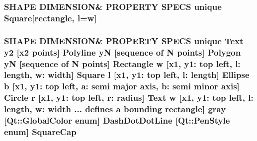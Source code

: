 \subsubsection[{\texorpdfstring{Square}{Square}}]{\setlength{\rightskip}{0pt plus 5cm}S\+H\+A\+PE D\+I\+M\+E\+N\+S\+I\+ON\& P\+R\+O\+P\+E\+R\+TY S\+P\+E\+CS unique {\bf Square}\mbox{[}rectangle, {\bf l}=w\mbox{]}}\hypertarget{shape__input__file__specs_8txt_ad077d50a4f33b6bb8f3d3b5f14c196fd}{}\label{shape__input__file__specs_8txt_ad077d50a4f33b6bb8f3d3b5f14c196fd}
\subsubsection[{\texorpdfstring{Square\+Cap}{SquareCap}}]{\setlength{\rightskip}{0pt plus 5cm}S\+H\+A\+PE D\+I\+M\+E\+N\+S\+I\+ON\& P\+R\+O\+P\+E\+R\+TY S\+P\+E\+CS unique {\bf Text} {\bf y2} \mbox{[}{\bf x2} points\mbox{]} {\bf Polyline} yN \mbox{[}sequence of N points\mbox{]} {\bf Polygon} yN \mbox{[}sequence of N points\mbox{]} {\bf Rectangle} w \mbox{[}{\bf x1}, y1\+: top left, l\+: length, w\+: width\mbox{]} {\bf Square} {\bf l} \mbox{[}{\bf x1}, y1\+: top left, l\+: length\mbox{]} {\bf Ellipse} b \mbox{[}{\bf x1}, y1\+: top left, a\+: semi major axis, b\+: semi minor axis\mbox{]} {\bf Circle} r \mbox{[}{\bf x1}, y1\+: top left, r\+: radius\mbox{]} {\bf Text} w \mbox{[}{\bf x1}, y1\+: top left, l\+: length, w\+: width ... defines {\bf a} bounding rectangle\mbox{]} gray \mbox{[}Qt\+::\+Global\+Color enum\mbox{]} Dash\+Dot\+Dot\+Line \mbox{[}Qt\+::\+Pen\+Style enum\mbox{]} Square\+Cap}\hypertarget{shape__input__file__specs_8txt_a022664fcd4bcb6fd131f71acd9191b4e}{}\label{shape__input__file__specs_8txt_a022664fcd4bcb6fd131f71acd9191b4e}
